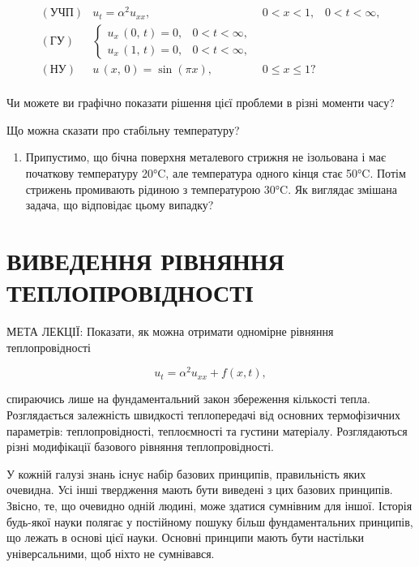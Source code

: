 \documentclass[
  ukrainian,
]{article}
\providecommand{\tightlist}{%
  \setlength{\itemsep}{0pt}\setlength{\parskip}{0pt}}
\begin{document}
\[
\begin{aligned} (\text{УЧП}) & u_t = \alpha^2 u_{xx}, & 0 < x < 1, & 0 < t < \infty, \\ (\text{ГУ}) & \begin{cases} u_x \, (0, \, t) = 0, & 0 < t < \infty, \\ u_x \, (1, \, t) = 0, & 0 < t < \infty, \end{cases} \\ (\text{НУ}) & u \, (x, \, 0) = \sin (\pi x), & 0 \leqslant x \leqslant 1? \\ \end{aligned}
\]

Чи можете ви графічно показати рішення цієї проблеми в різні моменти
часу?

Що можна сказати про стабільну температуру?

\begin{enumerate}
\def\labelenumi{\arabic{enumi}.}
\setcounter{enumi}{3}
\tightlist
\item
  Припустимо, що бічна поверхня металевого стрижня не ізольована і має
  початкову температуру 20°C, але температура одного кінця стає 50°C.
  Потім стрижень промивають рідиною з температурою 30°C. Як виглядає
  змішана задача, що відповідає цьому випадку?
\end{enumerate}

\section{ВИВЕДЕННЯ РІВНЯННЯ
ТЕПЛОПРОВІДНОСТІ}\label{ux432ux438ux432ux435ux434ux435ux43dux43dux44f-ux440ux456ux432ux43dux44fux43dux43dux44f-ux442ux435ux43fux43bux43eux43fux440ux43eux432ux456ux434ux43dux43eux441ux442ux456}

МЕТА ЛЕКЦІЇ: Показати, як можна отримати одномірне рівняння
теплопровідності

\[
u_t = \alpha^2 u_{xx} + f(x, t),
\]

спираючись лише на фундаментальний закон збереження кількості тепла.
Розглядається залежність швидкості теплопередачі від основних
термофізичних параметрів: теплопровідності, теплоємності та густини
матеріалу. Розглядаються різні модифікації базового рівняння
теплопровідності.

У кожній галузі знань існує набір базових принципів, правильність яких
очевидна. Усі інші твердження мають бути виведені з цих базових
принципів. Звісно, те, що очевидно одній людині, може здатися сумнівним
для іншої. Історія будь-якої науки полягає у постійному пошуку більш
фундаментальних принципів, що лежать в основі цієї науки. Основні
принципи мають бути настільки універсальними, щоб ніхто не сумнівався.
\end{document}
